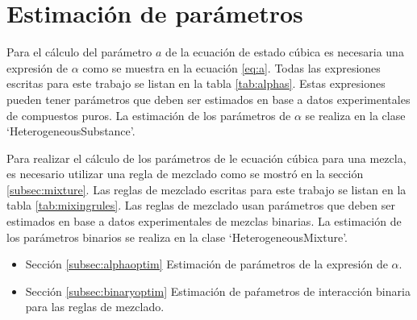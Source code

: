 \section{Estimación de parámetros}\label{sec:optimization}

	Para el cálculo del parámetro $a$ de la ecuación de estado cúbica es necesaria una expresión de $\alpha$ como se muestra en la ecuación \ref{eq:a}. Todas las expresiones escritas para este trabajo se listan en la tabla \ref{tab:alphas}. Estas expresiones pueden tener parámetros que deben ser estimados en base a datos experimentales de compuestos puros. La estimación de los parámetros de $\alpha$ se realiza en la clase `HeterogeneousSubstance'.

	Para realizar el cálculo de los parámetros de le ecuación cúbica para una mezcla, es necesario utilizar una regla de mezclado como se mostró en la sección \ref{subsec:mixture}. Las reglas de mezclado escritas para este trabajo se listan en la tabla \ref{tab:mixingrules}. Las reglas de mezclado usan parámetros que deben ser estimados en base a datos experimentales de mezclas binarias. La estimación de los parámetros binarios se realiza en la clase `HeterogeneousMixture'.

	\begin{itemize}
		\item{Sección} \ref{subsec:alphaoptim} Estimación de parámetros de la expresión de $\alpha$.
		\item{Sección} \ref{subsec:binaryoptim} Estimación de paŕametros de interacción binaria para las reglas de mezclado.
	\end{itemize}

	






